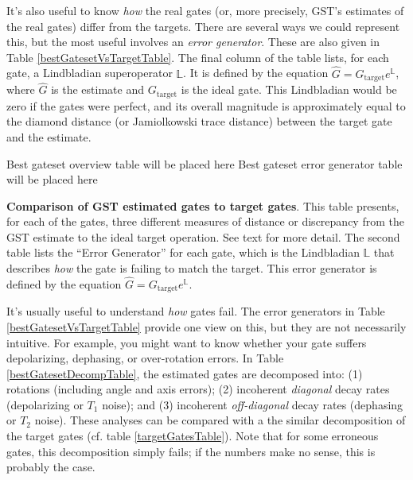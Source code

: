 \documentclass{article}[11pt]
\newcommand{\putfield}[2]{#2}
\begin{document}
It's also useful to know \emph{how} the real gates (or, more precisely, GST's estimates of the real gates) differ from the targets.  There are several ways we could represent this, but the most useful involves an \emph{error generator}.  These are also given in Table \ref{bestGatesetVsTargetTable}.  The final column of the table lists, for each gate, a Lindbladian superoperator $\mathbb{L}$.  It is defined by the equation $\hat{G} = G_{\mathrm{target}}e^{\mathbb{L}}$, where $\hat{G}$ is the estimate and $G_{\mathrm{target}}$ is the ideal gate.  This Lindbladian would be zero if the gates were perfect, and its overall magnitude is approximately equal to the diamond distance (or Jamiolkowski trace distance) between the target gate and the estimate.

\begin{table}[h]
\begin{center}
\putfield{bestGatesetVsTargetTable}{Best gateset overview table will be placed here}
\vspace{2em}
\putfield{bestGatesetErrorGenTable}{Best gateset error generator table will be placed here}
\caption{\putfield{tt_bestGatesetVsTargetTable}{}\putfield{tt_bestGatesetErrorGenTable}{}\textbf{Comparison of GST estimated gates to target gates}.  This table presents, for each of the gates, three different measures of distance or discrepancy from the GST estimate to the ideal target operation.  See text for more detail.  The second table lists the ``Error Generator'' for each gate, which is the Lindbladian $\mathbb{L}$ that describes \emph{how} the gate is failing to match the target.  This error generator is defined by the equation $\hat{G} = G_{\mathrm{target}}e^{\mathbb{L}}$. \label{bestGatesetVsTargetTable}}
\end{center}
\end{table}

It's usually useful to understand \emph{how} gates fail.  The error generators in Table \ref{bestGatesetVsTargetTable} provide one view on this, but they are not necessarily intuitive.   For example, you might want to know whether your gate suffers depolarizing, dephasing, or over-rotation errors.  In Table \ref{bestGatesetDecompTable}, the estimated gates are decomposed into: (1) rotations (including angle and axis errors); (2) incoherent \emph{diagonal} decay rates (depolarizing or $T_1$ noise); and (3) incoherent \emph{off-diagonal} decay rates (dephasing or $T_2$ noise).  These analyses can be compared with a the similar decomposition of the target gates (cf. table \ref{targetGatesTable}).  Note that for some erroneous gates, this decomposition simply fails; if the numbers make no sense, this is probably the case.
\end{document}
